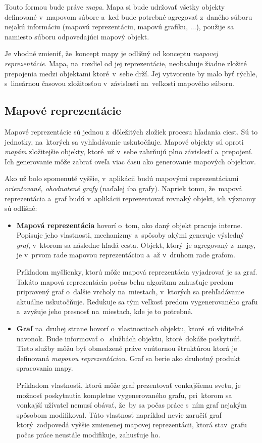 Touto formou bude práve \textit{mapa}. Mapa si bude udržovať všetky objekty definované v~mapovom súbore a~keď bude potrebné agregovať z~daného súboru nejakú informáciu (mapovú reprezentáciu, mapovú grafiku, ...), použije sa namiesto súboru odpovedajúci mapový objekt.

Je vhodné zmieniť, že~koncept mapy je odlišný od konceptu \textit{mapovej reprezentácie}. Mapa, na~rozdiel od jej reprezentácie, neobsahuje žiadne zložité prepojenia medzi objektami ktoré~v~sebe drží. Jej vytvorenie by malo byť rýchle, s~lineárnou časovou zložitosťou v~závislosti na~veľkosti mapového súboru.

\subsection{Mapové reprezentácie}\label{mapove_reprezentacie}

Mapové reprezentácie sú jednou z~dôležitých zložiek procesu hľadania ciest. Sú to jednotky, na~ktorých sa vyhľadávanie uskutočňuje. Mapové objekty sú oproti \textit{mapám} zložitejšie objekty, ktoré~už v~sebe zahrňujú plno závislostí a~prepojení. Ich generovanie môže zabrať oveľa viac času ako generovanie mapových objektov. 

Ako už bolo spomenuté vyššie, v~aplikácii budú mapovými reprezentáciami \textit{orientované, ohodnotené grafy} (naďalej iba grafy). Napriek tomu, že~mapová reprezentácia a~graf budú v~aplikácii reprezentovať rovnaký objekt, ich významy sú odlišné:

\begin{itemize}
    \item \textbf{Mapová reprezentácia} hovorí o~tom, ako daný objekt pracuje interne. Popisuje jeho vlastnosti, mechanizmy a~spôsoby akými generuje výsledný \textit{graf}, v~ktorom sa následne hľadá cesta. Objekt, ktorý~je agregovaný z~mapy, je v~prvom rade mapovou reprezentáciou a~až v~druhom rade grafom.
    
    Príkladom myšlienky, ktorú môže mapová reprezentácia vyjadrovať je  sa graf. Takáto mapová reprezentácia počas behu algoritmu zahusťuje predom pripravený graf o~ďalšie vrcholy na~miestach, v~ktorých sa prehľadávanie aktuálne uskutočňuje. Redukuje sa tým veľkosť predom vygenerovaného grafu a~zvyšuje jeho presnosť na~miestach, kde je to potrebné.   
    \item\textbf{Graf} na~druhej strane hovorí o~vlastnostiach objektu, ktoré~sú viditeľné navonok. Bude informovať o~ službách objektu, ktoré~dokáže poskytnúť. Tieto služby môžu byť obmedzené práve vnútornou štruktúrou ktorá je definovaná \textit{mapovou reprezentáciou}. Graf sa berie ako druhotný produkt spracovania mapy.   

    Príkladom vlastnosti, ktorú môže graf prezentovať vonkajšiemu svetu, je možnosť poskytnutia kompletne vygenerovaného grafu, pri~ktorom sa vonkajší užívateľ nemusí obávať, že~by sa počas práce s~ním graf nejakým spôsobom modifikoval. Túto vlastnosť napríklad nevie zaručiť graf ktorý~zodpovedá vyššie zmienenej mapovej reprezentácii, ktorá stav~grafu počas práce neustále modifikuje, zahusťuje ho.
\end{itemize}

